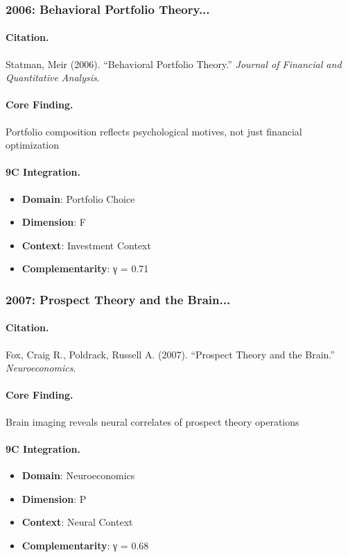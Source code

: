 \subsubsection{2006: Behavioral Portfolio Theory...}

\paragraph{Citation.}
Statman, Meir (2006). ``Behavioral Portfolio Theory.''
\textit{Journal of Financial and Quantitative Analysis}.

\paragraph{Core Finding.}
Portfolio composition reflects psychological motives, not just financial optimization

\paragraph{9C Integration.}
\begin{itemize}[nosep]
  \item \textbf{Domain}: Portfolio Choice
  \item \textbf{Dimension}: F
  \item \textbf{Context}: Investment Context
  \item \textbf{Complementarity}: γ = 0.71
\end{itemize}

\subsubsection{2007: Prospect Theory and the Brain...}

\paragraph{Citation.}
Fox, Craig R., Poldrack, Russell A. (2007). ``Prospect Theory and the Brain.''
\textit{Neuroeconomics}.

\paragraph{Core Finding.}
Brain imaging reveals neural correlates of prospect theory operations

\paragraph{9C Integration.}
\begin{itemize}[nosep]
  \item \textbf{Domain}: Neuroeconomics
  \item \textbf{Dimension}: P
  \item \textbf{Context}: Neural Context
  \item \textbf{Complementarity}: γ = 0.68
\end{itemize}


